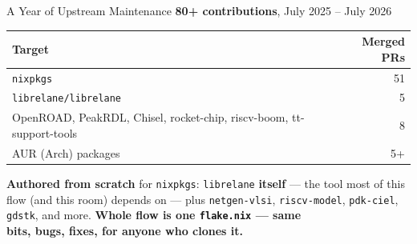 \documentclass[aspectratio=169]{beamer}
\begin{document}
\begin{frame}{A Year of Upstream Maintenance}
  \centering
  {\Large \textbf{80+ contributions}, July 2025 -- July 2026}
  \vspace{0.8em}

  \small
  \begin{tabular}{@{}lr@{}}
    \toprule
    \textbf{Target} & \textbf{Merged PRs} \\
    \midrule
    \texttt{nixpkgs} & 51 \\
    \texttt{librelane/librelane} & 5 \\
    OpenROAD, PeakRDL, Chisel, rocket-chip, riscv-boom, tt-support-tools & 8 \\
    AUR (Arch) packages & 5+ \\
    \bottomrule
  \end{tabular}

  \vspace{0.8em}
  \raggedright \normalsize
  \textbf{Authored from scratch} for \texttt{nixpkgs}: \texttt{librelane}
  \textbf{itself} — the tool most of this flow (and this room) depends on —
  plus \texttt{netgen-vlsi}, \texttt{riscv-model}, \texttt{pdk-ciel},
  \texttt{gdstk}, and more.
  \vfill
  \centering
  \textcolor{borgorange}{\textbf{Whole flow is one \texttt{flake.nix} — same}}\\
  \textcolor{borgorange}{\textbf{bits, bugs, fixes, for anyone who clones it.}}
\end{frame}
\end{document}
